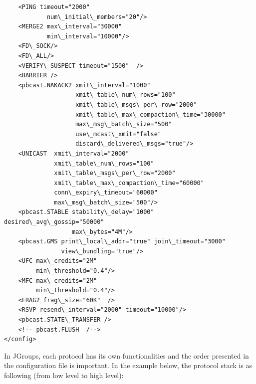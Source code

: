 \documentclass[a4paper,10pt]{report}
\begin{document}
\begin{lstlisting}
    <PING timeout="2000"
            num\_initial\_members="20"/>
    <MERGE2 max\_interval="30000"
            min\_interval="10000"/>
    <FD\_SOCK/>
    <FD\_ALL/>
    <VERIFY\_SUSPECT timeout="1500"  />
    <BARRIER />
    <pbcast.NAKACK2 xmit\_interval="1000"
                    xmit\_table\_num\_rows="100"
                    xmit\_table\_msgs\_per\_row="2000"
                    xmit\_table\_max\_compaction\_time="30000"
                    max\_msg\_batch\_size="500"
                    use\_mcast\_xmit="false"
                    discard\_delivered\_msgs="true"/>
    <UNICAST  xmit\_interval="2000"
              xmit\_table\_num\_rows="100"
              xmit\_table\_msgs\_per\_row="2000"
              xmit\_table\_max\_compaction\_time="60000"
              conn\_expiry\_timeout="60000"
              max\_msg\_batch\_size="500"/>
    <pbcast.STABLE stability\_delay="1000" desired\_avg\_gossip="50000"
                   max\_bytes="4M"/>
    <pbcast.GMS print\_local\_addr="true" join\_timeout="3000"
                view\_bundling="true"/>
    <UFC max\_credits="2M"
         min\_threshold="0.4"/>
    <MFC max\_credits="2M"
         min\_threshold="0.4"/>
    <FRAG2 frag\_size="60K"  />
    <RSVP resend\_interval="2000" timeout="10000"/>
    <pbcast.STATE\_TRANSFER />
    <!-- pbcast.FLUSH  /-->
</config>
\end{lstlisting}
In JGroups, each protocol has its own functionalities and the order presented in the configuration file is important. 
In the example below, the protocol stack is as following (from low level to high level):
\end{document}

